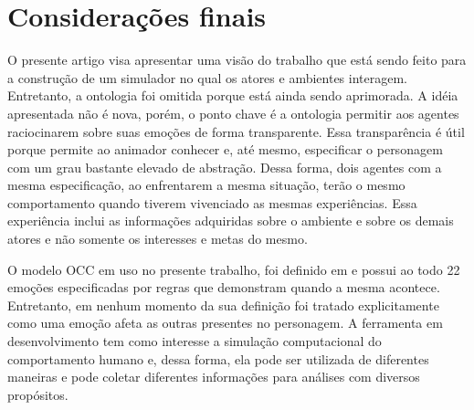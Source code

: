\chapter{Considerações finais}

O presente artigo visa apresentar uma visão do trabalho que está sendo feito
para a construção de um simulador no qual os atores e ambientes interagem.
Entretanto, a ontologia foi omitida porque está ainda sendo aprimorada.  A
idéia apresentada não é nova, porém, o ponto chave é a ontologia permitir aos
agentes raciocinarem sobre suas emoções de forma transparente.  Essa
transparência é útil porque permite ao animador conhecer e, até mesmo,
especificar o personagem com um grau bastante elevado de abstração.
%
Dessa forma, dois agentes com a mesma especificação, ao enfrentarem a mesma
situação, terão o mesmo comportamento quando tiverem vivenciado as mesmas
experiências. Essa experiência inclui as informações adquiridas sobre o
ambiente e sobre os demais atores e não somente os interesses e metas do
mesmo.

O modelo OCC em uso no presente trabalho, foi definido em
\citeyear{ortony1988cse} e possui ao todo 22 emoções especificadas por regras
que demonstram quando a mesma acontece. Entretanto, em nenhum momento da sua
definição foi tratado explicitamente como uma emoção afeta as outras presentes
no personagem.
%
A ferramenta em desenvolvimento tem como interesse a simulação computacional
do comportamento humano e, dessa forma, ela pode ser utilizada de diferentes
maneiras e pode coletar diferentes informações para análises com diversos
propósitos.
